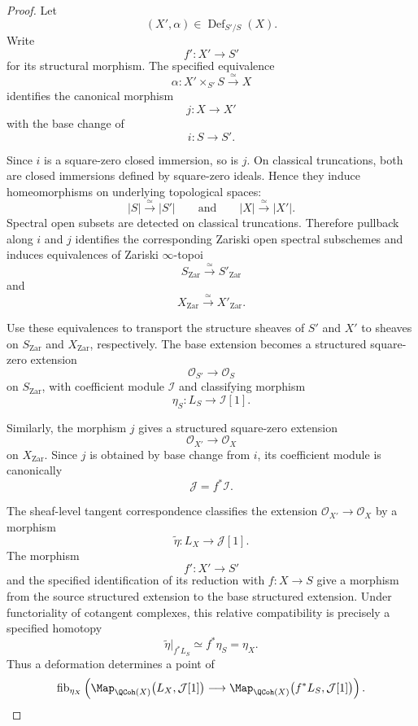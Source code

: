 \begin{proof}
Let
\[
    (X',\alpha)
    \in
    \operatorname{Def}_{S'/S}(X).
\]
Write
\[
    f'
    \colon
    X'
    \longrightarrow
    S'
\]
for its structural morphism. The specified equivalence
\[
    \alpha
    \colon
    X'\times_{S'}S
    \xrightarrow{\simeq}
    X
\]
identifies the canonical morphism
\[
    j
    \colon
    X
    \longrightarrow
    X'
\]
with the base change of
\[
    i
    \colon
    S
    \longrightarrow
    S'.
\]

Since \(i\) is a square-zero closed immersion, so is \(j\). On
classical truncations, both are closed immersions defined by
square-zero ideals. Hence they induce homeomorphisms on underlying
topological spaces:
\[
    |S|
    \xrightarrow{\simeq}
    |S'|
    \qquad\text{and}\qquad
    |X|
    \xrightarrow{\simeq}
    |X'|.
\]
Spectral open subsets are detected on classical truncations. Therefore
pullback along \(i\) and \(j\) identifies the corresponding Zariski
open spectral subschemes and induces equivalences of Zariski
\(\infty\)-topoi
\[
    S_{\mathrm{Zar}}
    \xrightarrow{\simeq}
    S'_{\mathrm{Zar}}
\]
and
\[
    X_{\mathrm{Zar}}
    \xrightarrow{\simeq}
    X'_{\mathrm{Zar}}.
\]

Use these equivalences to transport the structure sheaves of \(S'\) and
\(X'\) to sheaves on \(S_{\mathrm{Zar}}\) and
\(X_{\mathrm{Zar}}\), respectively. The base extension becomes a
structured square-zero extension
\[
    \mathcal O_{S'}
    \longrightarrow
    \mathcal O_S
\]
on \(S_{\mathrm{Zar}}\), with coefficient module \(\mathcal I\) and
classifying morphism
\[
    \eta_S
    \colon
    L_S
    \longrightarrow
    \mathcal I[1].
\]

Similarly, the morphism \(j\) gives a structured square-zero extension
\[
    \mathcal O_{X'}
    \longrightarrow
    \mathcal O_X
\]
on \(X_{\mathrm{Zar}}\). Since \(j\) is obtained by base change from
\(i\), its coefficient module is canonically
\[
    \mathcal J
    =
    f^*\mathcal I.
\]

The sheaf-level tangent correspondence classifies the extension
\(\mathcal O_{X'}\to\mathcal O_X\) by a morphism
\[
    \widetilde\eta
    \colon
    L_X
    \longrightarrow
    \mathcal J[1].
\]
The morphism
\[
    f'
    \colon
    X'
    \longrightarrow
    S'
\]
and the specified identification of its reduction with
\(f:X\to S\) give a morphism from the source structured extension to
the base structured extension. Under functoriality of cotangent
complexes, this relative compatibility is precisely a specified
homotopy
\[
    \widetilde\eta|_{f^*L_S}
    \simeq
    f^*\eta_S
    =
    \eta_X.
\]
Thus a deformation determines a point of
\[
    \operatorname{fib}_{\eta_X}
    \left(
        \Map_{\QCoh(X)}
        \bigl(
            L_X,
            \mathcal J[1]
        \bigr)
        \longrightarrow
        \Map_{\QCoh(X)}
        \bigl(
            f^*L_S,
            \mathcal J[1]
        \bigr)
    \right).
\]


\end{proof}

